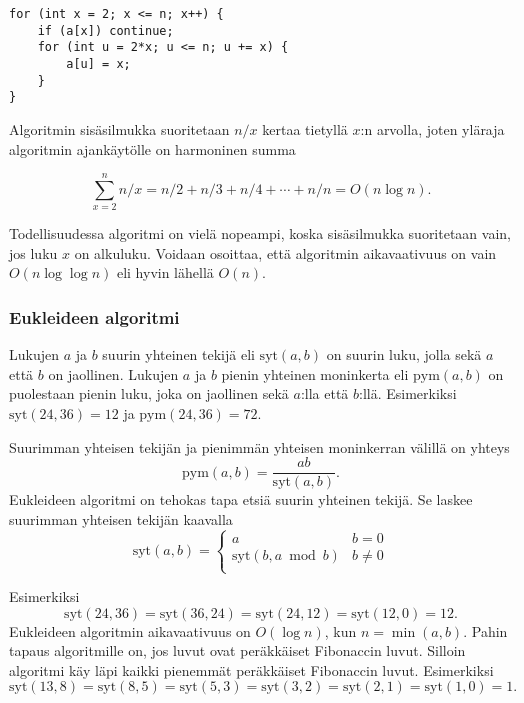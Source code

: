 \begin{lstlisting}
for (int x = 2; x <= n; x++) {
    if (a[x]) continue;
    for (int u = 2*x; u <= n; u += x) {
        a[u] = x;
    }
}
\end{lstlisting}

\noindent
Algoritmin sisäsilmukka suoritetaan
$n/x$ kertaa tietyllä $x$:n arvolla,
joten yläraja algoritmin ajankäytölle
on harmoninen summa


\[\sum_{x=2}^n n/x = n/2 + n/3 + n/4 + \cdots + n/n = O(n \log n).\]

Todellisuudessa algoritmi on vielä nopeampi,
koska sisäsilmukka suoritetaan vain,
jos luku $x$ on alkuluku.
Voidaan osoittaa, että algoritmin aikavaativuus
on vain $O(n \log \log n)$ eli hyvin lähellä $O(n)$.

\subsubsection{Eukleideen algoritmi}


Lukujen $a$ ja $b$ suurin yhteinen tekijä eli $\textrm{syt}(a,b)$
on suurin luku, jolla sekä $a$ että $b$ on jaollinen.
Lukujen $a$ ja $b$ pienin yhteinen moninkerta eli $\textrm{pym}(a,b)$
on puolestaan pienin luku, joka on jaollinen sekä $a$:lla että $b$:llä.
Esimerkiksi $\textrm{syt}(24,36)=12$ ja
$\textrm{pym}(24,36)=72$.

Suurimman yhteisen tekijän ja pienimmän yhteisen
moninkerran välillä on yhteys
\[\textrm{pym}(a,b)=\frac{ab}{\textrm{syt}(a,b)}.\]
Eukleideen algoritmi on tehokas tapa etsiä
suurin yhteinen tekijä.
Se laskee suurimman yhteisen tekijän kaavalla
\begin{equation*}
    \textrm{syt}(a,b) = \begin{cases}
               a        & b = 0\\
               \textrm{syt}(b,a \bmod b) & b \neq 0\\
           \end{cases}
\end{equation*}

\noindent
Esimerkiksi
\[\textrm{syt}(24,36) = \textrm{syt}(36,24)
= \textrm{syt}(24,12) = \textrm{syt}(12,0)=12.\]
Eukleideen algoritmin aikavaativuus
on $O(\log n)$, kun $n=\min(a,b)$.
Pahin tapaus algoritmille on, jos luvut ovat
peräkkäiset Fibonaccin luvut.
Silloin algoritmi käy läpi kaikki pienemmät
peräkkäiset Fibonaccin luvut.
Esimerkiksi
\[\textrm{syt}(13,8)=\textrm{syt}(8,5)
=\textrm{syt}(5,3)=\textrm{syt}(3,2)=\textrm{syt}(2,1)=\textrm{syt}(1,0)=1.\]

